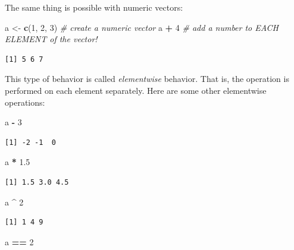 \documentclass[
]{book}
\newenvironment{Shaded}{\begin{snugshade}}{\end{snugshade}}
\newcommand{\CommentTok}[1]{\textcolor[rgb]{0.56,0.35,0.01}{\textit{#1}}}
\newcommand{\DecValTok}[1]{\textcolor[rgb]{0.00,0.00,0.81}{#1}}
\newcommand{\FloatTok}[1]{\textcolor[rgb]{0.00,0.00,0.81}{#1}}
\newcommand{\KeywordTok}[1]{\textcolor[rgb]{0.13,0.29,0.53}{\textbf{#1}}}
\newcommand{\NormalTok}[1]{#1}
\newcommand{\OperatorTok}[1]{\textcolor[rgb]{0.81,0.36,0.00}{\textbf{#1}}}
\newcommand{\StringTok}[1]{\textcolor[rgb]{0.31,0.60,0.02}{#1}}
\begin{document}
The same thing is possible with numeric vectors:

\begin{Shaded}
\begin{Highlighting}[]
\NormalTok{a <-}\StringTok{ }\KeywordTok{c}\NormalTok{(}\DecValTok{1}\NormalTok{, }\DecValTok{2}\NormalTok{, }\DecValTok{3}\NormalTok{)   }\CommentTok{# create a numeric vector}
\NormalTok{a }\OperatorTok{+}\StringTok{ }\DecValTok{4}             \CommentTok{# add a number to EACH ELEMENT of the vector!}
\end{Highlighting}
\end{Shaded}

\begin{verbatim}
[1] 5 6 7
\end{verbatim}

This type of behavior is called \emph{elementwise} behavior. That is, the operation is performed on each element separately.
Here are some other elementwise operations:

\begin{Shaded}
\begin{Highlighting}[]
\NormalTok{a }\OperatorTok{-}\StringTok{ }\DecValTok{3}
\end{Highlighting}
\end{Shaded}

\begin{verbatim}
[1] -2 -1  0
\end{verbatim}

\begin{Shaded}
\begin{Highlighting}[]
\NormalTok{a }\OperatorTok{*}\StringTok{ }\FloatTok{1.5}
\end{Highlighting}
\end{Shaded}

\begin{verbatim}
[1] 1.5 3.0 4.5
\end{verbatim}

\begin{Shaded}
\begin{Highlighting}[]
\NormalTok{a }\OperatorTok{^}\StringTok{ }\DecValTok{2}
\end{Highlighting}
\end{Shaded}

\begin{verbatim}
[1] 1 4 9
\end{verbatim}

\begin{Shaded}
\begin{Highlighting}[]
\NormalTok{a }\OperatorTok{==}\StringTok{ }\DecValTok{2}
\end{Highlighting}
\end{Shaded}
\end{document}
